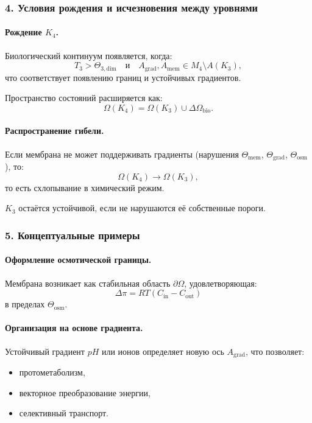 \subsubsection{4. Условия рождения и исчезновения между уровнями}

\paragraph{Рождение \texorpdfstring{$K_4$}{K_4}.}
Биологический континуум появляется, когда:
\[
T_3 > \Theta_{3,\mathrm{dim}}
\quad \text{и} \quad
A_{\mathrm{grad}}, A_{\mathrm{mem}} \in M_4 \setminus A(K_3),
\]
что соответствует появлению границ и устойчивых градиентов.

Пространство состояний расширяется как:
\[
\Omega(K_4) = \Omega(K_3) \cup \Delta\Omega_{\mathrm{bio}}.
\]

\paragraph{Распространение гибели.}
Если мембрана не может поддерживать градиенты (нарушения
$\Theta_{\mathrm{mem}}$, $\Theta_{\mathrm{grad}}$, $\Theta_{\mathrm{osm}}$), то:
\[
\Omega(K_4) \rightarrow \Omega(K_3),
\]
то есть схлопывание в химический режим.

$K_3$ остаётся устойчивой, если не нарушаются её собственные пороги.

\subsubsection{5. Концептуальные примеры}

\paragraph{Оформление осмотической границы.}
Мембрана возникает как стабильная область $\partial\Omega$, удовлетворяющая:
\[
\Delta\pi = RT(C_{\mathrm{in}} - C_{\mathrm{out}})
\]
в пределах $\Theta_{\mathrm{osm}}$.

\paragraph{Организация на основе градиента.}
Устойчивый градиент $pH$ или ионов определяет новую ось $A_{\mathrm{grad}}$, что
позволяет:
\begin{itemize}
  \item протометаболизм,
  \item векторное преобразование энергии,
  \item селективный транспорт.
\end{itemize}

